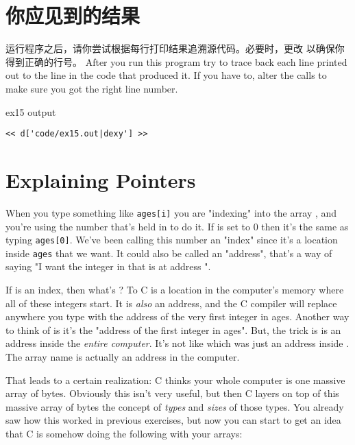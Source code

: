 \section{你应见到的结果}

运行程序之后，请你尝试根据每行打印结果追溯源代码。必要时，更改
以确保你得到正确的行号。
After you run this program try to trace back each line printed out to the
line in the code that produced it.  If you have to, alter the 
calls to make sure you got the right line number.

\begin{code}{ex15 output}
\begin{lstlisting}
<< d['code/ex15.out|dexy'] >>
\end{lstlisting}
\end{code}


\section{Explaining Pointers}

When you type something like \verb|ages[i]| you are "indexing" into the array
, and you're using the number that's held in  to do it.
If  is set to 0 then it's the same as typing \verb|ages[0]|.  We've
been calling this number  an "index" since it's a location inside
\verb|ages| that we want.  It could also be called an "address", that's a way
of saying "I want the integer in  that is at address ".

If  is an index, then what's ?  To C  is a
location in the computer's memory where all of these integers start.  It is
\emph{also} an address, and the C compiler will replace anywhere you type
 with the address of the very first integer in ages.  Another way
to think of  is it's the "address of the first integer in
ages".  But, the trick is  is an address inside the \emph{entire
computer}.  It's not like  which was just an address inside
.  The  array name is actually an address in the
computer.

That leads to a certain realization:  C thinks your whole computer is one
massive array of bytes.  Obviously this isn't very useful, but then C layers on
top of this massive array of bytes the concept of \emph{types} and \emph{sizes}
of those types.  You already saw how this worked in previous exercises, but now
you can start to get an idea that C is somehow doing the following with your
arrays:

